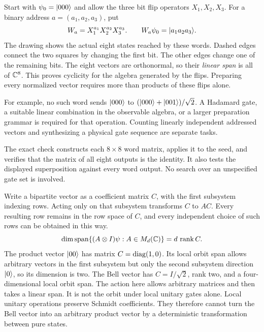 Start with $\psi_0=\lvert 000\rangle$ and allow the three bit flip operators $X_1,X_2,X_3$. For a binary address $a=(a_1,a_2,a_3)$, put
\[
W_a=X_1^{a_1}X_2^{a_2}X_3^{a_3}.
\qquad W_a\psi_0=\lvert a_1a_2a_3\rangle.
\]
The drawing shows the actual eight states reached by these words. Dashed edges connect the two squares by changing the first bit. The other edges change one of the remaining bits.
The eight vectors are orthonormal, so their \emph{linear span} is all of $\CC^8$. This proves cyclicity for the algebra generated by the flips. Preparing every normalized vector requires more than products of these flips alone.

For example, no such word sends $\lvert 000\rangle$ to $(\lvert 000\rangle+\lvert 001\rangle)/\sqrt2$. A Hadamard gate, a suitable linear combination in the observable algebra, or a larger preparation grammar is required for that operation. Counting linearly independent addressed vectors and synthesizing a physical gate sequence are separate tasks.

The exact check constructs each $8\times8$ word matrix, applies it to the seed, and verifies that the matrix of all eight outputs is the identity. It also tests the displayed superposition against every word output. No search over an unspecified gate set is involved.

Write a bipartite vector as a coefficient matrix $C$, with the first subsystem indexing rows. Acting only on that subsystem transforms $C$ to $AC$. Every resulting row remains in the row space of $C$, and every independent choice of such rows can be obtained in this way.
\[
\dim\Span\{(A\otimes I)\psi:A\in M_d(\CC)\}
=d\,\rank C.
\]
The product vector $\lvert 00\rangle$ has matrix $C=\operatorname{diag}(1,0)$. Its local orbit span allows arbitrary vectors in the first subsystem but only the second subsystem direction $\lvert 0\rangle$, so its dimension is two. The Bell vector has $C=I/\sqrt2$, rank two, and a four-dimensional local orbit span.
The action here allows arbitrary matrices and then takes a linear span. It is not the orbit under local unitary gates alone. Local unitary operations preserve Schmidt coefficients. They therefore cannot turn the Bell vector into an arbitrary product vector by a deterministic transformation between pure states.

